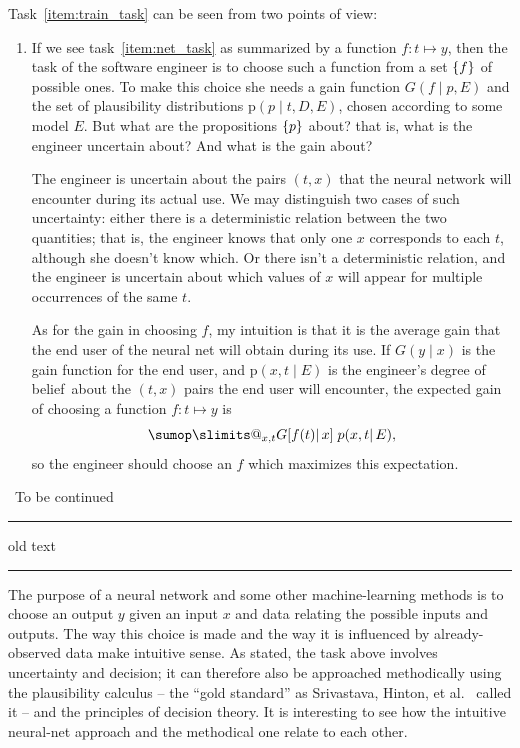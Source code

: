 \documentclass[\ifafour a4paper,12pt,\else a5paper,10pt,\fi%
onecolumn,oneside,article,%
british%
]{memoir}
\makeatletter
\theoremstyle{remark}
\theoremstyle{innote}
\def\sum{\DOTSI\sumop\slimits@}
\newcommand*{\citey}{\parencites*}
\DeclarePairedDelimiter\set{\{}{\}}
\newcommand*{\pf}{\mathrm{p}}%
\renewcommand*{\|}{\mathpunct{|}}
\newcommand*{\etal}{{et al.}}
\newcommand*{\puzzle}{\maltese}
\newcommand{\mynote}[1]{ {\color{notecolour}\puzzle\ #1}}
\newcommand*{\dob}{degree of belief}
\newcommand*{\yp}{p}
\newcommand*{\yg}{G}
\newcommand*{\yD}{D}
\newcommand*{\yE}{E}
\makeatother
\begin{document}
Task~\ref{item:train_task} can be seen from two points of view:
\begin{enumerate}[wide,label=(\arabic*)]
\item If we see task~\ref{item:net_task} as summarized by a function
  $f\colon t\mapsto y$, then the task of the software engineer is to choose
  such a function from a set $\set{f}$ of possible ones. To make this
  choice she needs a gain function $\yg(f \| \yp, \yE)$ and the set of
  plausibility distributions $\pf(\yp \| t,\yD, \yE)$, chosen according to
  some model $\yE$. But what are the propositions $\set{\yp}$ about? that
  is, what is the engineer uncertain about? And what is the gain about?

  The engineer is uncertain about the pairs $(t,x)$ that the neural network
  will encounter during its actual use. We may distinguish two cases of
  such uncertainty: either there is a deterministic relation between the
  two quantities; that is, the engineer knows that only one $x$ corresponds
  to each $t$, although she doesn't know which. Or there isn't a
  deterministic relation, and the engineer is uncertain about which values
  of $x$ will appear for multiple occurrences of the same $t$.

  As for the gain in choosing $f$, my intuition is that it is the average
  gain that the end user of the neural net will obtain during its use. If
  $\yg(y \|x)$ is the gain function for the end user, and
  $\pf(x,t \| \yE)$ is the engineer's \dob\ about the $(t,x)$ pairs the end
  user will encounter, the expected gain of choosing a function $f\colon t
  \mapsto y$ is
  \begin{equation}
    \label{eq:engineer_gain}
    \sum_{x,t} \yg[f(t) \|x]\;\yp(x,t \| \yE),
  \end{equation}
  so the engineer should choose an $f$ which maximizes this expectation.
\end{enumerate}

\mynote{To be continued}




\clearpage
\hrule
old text
\hrule

The purpose of a neural network and some other machine-learning methods is
to choose an output $y$ given an input $x$ and data relating the possible
inputs and outputs. The way this choice is made and the way it is
influenced by already-observed data make intuitive sense. As stated, the
task above involves uncertainty and decision; it can therefore also be
approached methodically using the plausibility calculus -- the
\enquote{gold standard} as Srivastava, Hinton, \etal\
\citey{srivastavaetal2014} called it -- and the principles of decision
theory. It is interesting to see how the intuitive neural-net approach and
the methodical one relate to each other.
\end{document}
